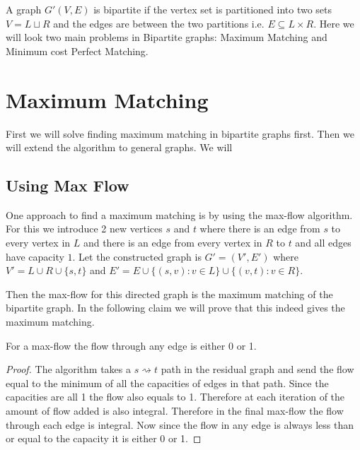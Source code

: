 \documentclass[twoside]{article}
\begin{document}


A graph $G'(V,E)$ is bipartite if the vertex set is partitioned into two sets $V=L\sqcup R$ and the edges are between the two partitions i.e. $E\subseteq L\times R$. Here we will look two main problems in Bipartite graphs: Maximum Matching and Minimum cost Perfect Matching.
\section{Maximum Matching}

\begin{algoprob}
\end{algoprob}

First we will solve finding maximum matching in bipartite graphs first. Then we will extend the algorithm to general graphs. We will

\subsection{Using Max Flow}
One approach to find a maximum matching is by using the max-flow algorithm. For this we introduce 2 new vertices $s$ and $t$ where there is an edge from $s$ to every vertex in $L$ and there is an edge from every vertex in $R$ to $t$ and all edges have capacity $1$. Let the constructed graph is $G'=(V', E')$ where $V'=L\cup R\cup\{s,t\}$ and $E'=E\cup \{(s,v)\colon v\in L\}\cup \{(v,t)\colon v\in R\}$.

Then the max-flow for this directed graph is the maximum matching of the bipartite graph. In the following claim we will prove that this indeed gives the maximum matching. 
\begin{lemma}{}{}
	For a max-flow the flow through any edge is either 0 or 1.
\end{lemma}
\begin{proof}
	The  algorithm takes a $s\rightsquigarrow t$ path in the residual graph and send the flow equal to the minimum of all the capacities of edges in that path. Since the capacities are all 1 the flow also equals to 1. Therefore at each iteration of  the amount of flow added is also integral. Therefore in the final max-flow the flow through each edge is integral. Now since the flow in any edge is always less than or equal to the capacity it is either 0 or 1.
\end{proof}
\end{document}
